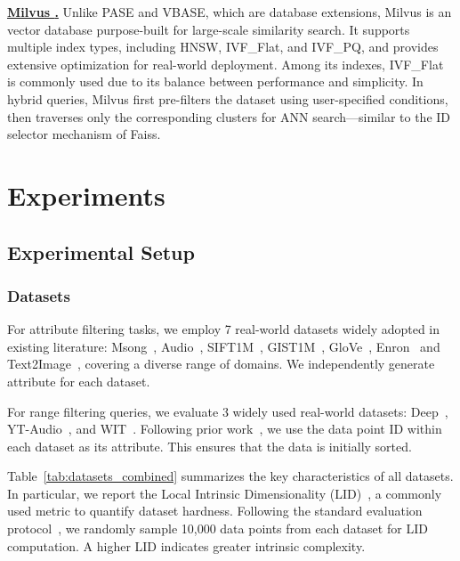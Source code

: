 \documentclass[sigconf, nonacm]{acmart}
\begin{document}
	
	\noindent\textbf{\underline{Milvus \cite{milvus}.}}  
	Unlike PASE and VBASE, which are database extensions, Milvus is an vector database purpose-built for large-scale similarity search. It supports multiple index types, including HNSW, IVF\_Flat, and IVF\_PQ, and provides extensive optimization for real-world deployment. Among its indexes, IVF\_Flat is commonly used due to its balance between performance and simplicity. In hybrid queries, Milvus first pre-filters the dataset using user-specified conditions, then traverses only the corresponding clusters for ANN search—similar to the ID selector mechanism of Faiss.
	
	\section{Experiments}
	\subsection{Experimental Setup}
	\subsubsection{Datasets}
	
	For attribute filtering tasks, we employ 7 real-world datasets widely adopted in existing literature: Msong~\cite{msong2011}, Audio~\cite{audio_unknown}, SIFT1M~\cite{sift2010}, GIST1M~\cite{sift2010}, GloVe~\cite{GloVe2015}, Enron~\cite{enron2015} and Text2Image~\cite{texttoimage}, covering a diverse range of domains. We independently generate attribute for each dataset.
	
	
	For range filtering queries, we evaluate 3 widely used real-world datasets: Deep~\cite{yandex_deep_dataset}, YT-Audio~\cite{youtube8m_dataset}, and WIT~\cite{wit_dataset}. Following prior work~\cite{DSG}, we use the data point ID within each dataset as its attribute. This ensures that the data is initially sorted.
	
	Table~\ref{tab:datasets_combined} summarizes the key characteristics of all datasets. In particular, we report the Local Intrinsic Dimensionality (LID)~\cite{Lid}, a commonly used metric to quantify dataset hardness. Following the standard evaluation protocol~\cite{LID2}, we randomly sample 10,000 data points from each dataset for LID computation. A higher LID indicates greater intrinsic complexity.
	
\end{document}
